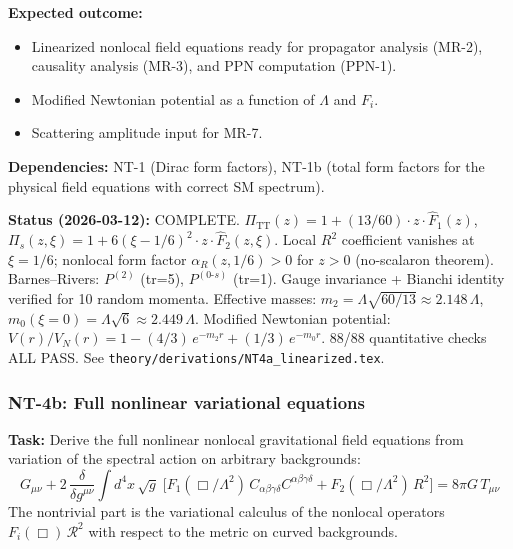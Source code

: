 \documentclass[12pt,a4paper]{article}
\newcommand{\task}[1]{\noindent\textbf{Task:} #1\par}
\newcommand{\outcome}[1]{\noindent\textbf{Expected outcome:} #1\par}
\newcommand{\deps}[1]{\noindent\textbf{Dependencies:} #1\par}
\begin{document}
\outcome{
\begin{itemize}
  \item Linearized nonlocal field equations ready for propagator analysis (MR-2),
    causality analysis (MR-3), and PPN computation (PPN-1).
  \item Modified Newtonian potential as a function of $\Lambda$ and $F_i$.
  \item Scattering amplitude input for MR-7.
\end{itemize}
}

\deps{NT-1 (Dirac form factors), NT-1b (total form factors for the
physical field equations with correct SM spectrum).}

\textbf{Status (2026-03-12):} \textcolor{proven}{COMPLETE.}
$\Pi_{\text{TT}}(z) = 1 + (13/60)\cdot z\cdot\hat{F}_1(z)$,
$\Pi_s(z,\xi) = 1 + 6(\xi-1/6)^2\cdot z\cdot\hat{F}_2(z,\xi)$.
Local $R^2$ coefficient vanishes at $\xi=1/6$; nonlocal form factor
$\alpha_R(z, 1/6) > 0$ for $z > 0$ (no-scalaron theorem).
Barnes--Rivers: $P^{(2)}$ (tr=5), $P^{(0\text{-}s)}$ (tr=1).
Gauge invariance + Bianchi identity verified for 10 random momenta.
Effective masses: $m_2 = \Lambda\sqrt{60/13} \approx 2.148\,\Lambda$,
$m_0(\xi=0) = \Lambda\sqrt{6} \approx 2.449\,\Lambda$.
Modified Newtonian potential:
$V(r)/V_N(r) = 1 - (4/3)\,e^{-m_2 r} + (1/3)\,e^{-m_0 r}$.
88/88 quantitative checks ALL PASS.
See \texttt{theory/derivations/NT4a\_linearized.tex}.

\subsubsection{NT-4b: Full nonlinear variational equations}
\label{task:NT4b}

\task{Derive the full nonlinear nonlocal gravitational field equations from
variation of the spectral action on arbitrary backgrounds:
\begin{equation}\label{eq:nonlocal-eom}
  G_{\mu\nu} + 2\,\frac{\delta}{\delta g^{\mu\nu}}
  \int d^4x\,\sqrt{g}\;\bigl[
  F_1(\Box/\Lambda^2)\,C_{\alpha\beta\gamma\delta}C^{\alpha\beta\gamma\delta}
  + F_2(\Box/\Lambda^2)\,R^2 \bigr] = 8\pi G\, T_{\mu\nu}
\end{equation}
The nontrivial part is the variational calculus of the nonlocal operators
$F_i(\Box)\,\mathcal{R}^2$ with respect to the metric on curved backgrounds.}
\end{document}
